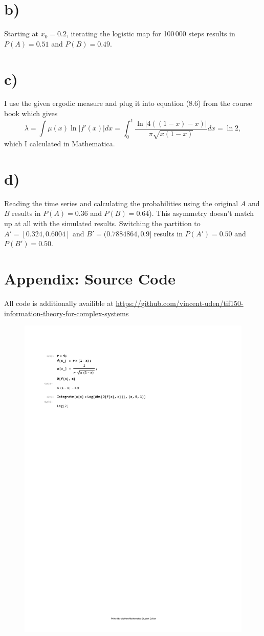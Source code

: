 \documentclass[a4paper, 12pt]{article}
\begin{document}
\section*{b)}
Starting at $x_0 = 0.2$, iterating the logistic map for 100\,000 steps results in $P(A) = 0.51$ and $P(B) = 0.49$.

\section*{c)}
I use the given ergodic measure and plug it into equation (8.6) from the course book which gives
\begin{equation}
    \lambda = \int \mu(x) \ln |f'(x)| dx = \int_0^1 \frac{\ln |4((1 - x) - x)|}{\pi \sqrt{x (1-x)}} dx = \ln 2,
\end{equation}
which I calculated in Mathematica.

\section*{d)}
Reading the time series and calculating the probabilities using the original $A$ and $B$ results in $P(A) = 0.36$ and $P(B) = 0.64$). This asymmetry doesn't match up at all with the simulated results. Switching the partition to $A' = [0.324, 0.6004]$ and $B' = (0.7884864, 0.9]$ results in $P(A') = 0.50$ and $P(B') = 0.50$.


\section*{Appendix: Source Code}
All code is additionally availible at \url{https://github.com/vincent-uden/tif150-information-theory-for-complex-systems}
\begin{figure}[ht!]
    \centering
    \includegraphics[trim={2cm 20cm 2cm 2cm}]{../../src/integral.pdf}
\end{figure}
\end{document}
